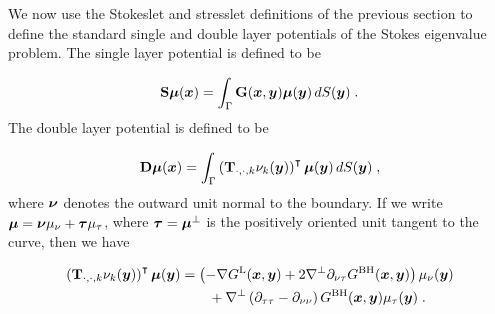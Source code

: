 We now use the Stokeslet and stresslet definitions
of the previous section to define the standard single
and double layer potentials of the Stokes eigenvalue
problem. The single layer potential is defined to
be

\begin{equation}
  {\bf S} {\boldsymbol \mu} ({\boldsymbol x}) = \int_\Gamma {\bf G} ({\boldsymbol x},{\boldsymbol y}) {\boldsymbol \mu}({\boldsymbol y})
  \, dS({\boldsymbol y}) \; .
\end{equation}
The double layer potential is defined to be

\begin{equation}
  {\bf D} {\boldsymbol \mu} ({\boldsymbol x}) = \int_\Gamma \left ( {\bf T}_{\cdot,\cdot,k}\nu_k({\boldsymbol y})
  \right )^\intercal {\boldsymbol \mu}({\boldsymbol y}) \, dS({\boldsymbol y}) \; ,
\end{equation}
where ${\boldsymbol \nu}$ denotes the outward unit normal to the boundary.
If we write ${\boldsymbol \mu} = {\boldsymbol \nu} \mu_\nu + {\boldsymbol \tau} \mu_\tau$,
where ${\boldsymbol \tau} = {\boldsymbol \mu}^\bot$ is the positively oriented unit
tangent to the curve, then we have

\begin{align} \label{eq:stokesdlkernel}
  \left ( {\bf T}_{\cdot,\cdot,k}\nu_k({\boldsymbol y}) \right )^\intercal
  {\boldsymbol \mu}({\boldsymbol y}) &= \left ( - \nabla G^{\textrm{L}}({\boldsymbol x},{\boldsymbol y}) + 2 \nabla^\bot
  \partial_{\nu\tau} G^{\textrm{BH}}({\boldsymbol x},{\boldsymbol y}) \right ) \mu_\nu({\boldsymbol y}) \nonumber \\
  & \qquad+
  \nabla^\bot \left (\partial_{\tau\tau}-\partial_{\nu\nu} \right )
  G^{\textrm{BH}}({\boldsymbol x},{\boldsymbol y}) \mu_\tau({\boldsymbol y}) \; .
\end{align}

